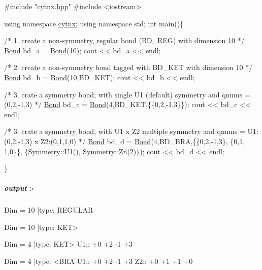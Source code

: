 \begin{DoxyCodeInclude}
\textcolor{preprocessor}{#include "cytnx.hpp"}
\textcolor{preprocessor}{#include <iostream>}


\textcolor{keyword}{using namespace }\hyperlink{namespacecytnx}{cytnx};
\textcolor{keyword}{using namespace }std;
\textcolor{keywordtype}{int} main()\{ 

    \textcolor{comment}{/* 1.}
\textcolor{comment}{        create a non-symmetry, regular bond (BD\_REG) }
\textcolor{comment}{        with dimension 10}
\textcolor{comment}{    */}
    \hyperlink{classcytnx_1_1Bond}{Bond} bd\_a = \hyperlink{classcytnx_1_1Bond}{Bond}(10);
    cout << bd\_a << endl;

    \textcolor{comment}{/* 2. }
\textcolor{comment}{        create a non-symmetry bond tagged with BD\_KET }
\textcolor{comment}{        with dimension 10}
\textcolor{comment}{    */}
    \hyperlink{classcytnx_1_1Bond}{Bond} bd\_b = \hyperlink{classcytnx_1_1Bond}{Bond}(10,BD\_KET);
    cout << bd\_b << endl;

    \textcolor{comment}{/* 3.}
\textcolor{comment}{        crate a symmetry bond, }
\textcolor{comment}{        with single U1 (default) symmetry and qnums = (0,2,-1,3)}
\textcolor{comment}{    */}
    \hyperlink{classcytnx_1_1Bond}{Bond} bd\_c = \hyperlink{classcytnx_1_1Bond}{Bond}(4,BD\_KET,\{\{0,2,-1,3\}\});
    cout << bd\_c << endl;

    \textcolor{comment}{/* 3.}
\textcolor{comment}{        crate a symmetry bond, }
\textcolor{comment}{        with U1 x Z2 multiple symmetry }
\textcolor{comment}{        and qnums = U1:(0,2,-1,3) x Z2:(0,1,1,0)}
\textcolor{comment}{    */}
    \hyperlink{classcytnx_1_1Bond}{Bond} bd\_d = \hyperlink{classcytnx_1_1Bond}{Bond}(4,BD\_BRA,\{\{0,2,-1,3\},
                               \{0,1, 1,0\}\},
                              \{Symmetry::U1(),
                               Symmetry::Zn(2)\});
    cout << bd\_d << endl;

    
    


\}

\end{DoxyCodeInclude}
 \subparagraph*{output$>$}


\begin{DoxyVerbInclude}
Dim = 10 |type: REGULAR 

Dim = 10 |type: KET>     

Dim = 4 |type: KET>     
 U1::  +0 +2 -1 +3

Dim = 4 |type: <BRA     
 U1::  +0 +2 -1 +3
 Z2::  +0 +1 +1 +0

\end{DoxyVerbInclude}
